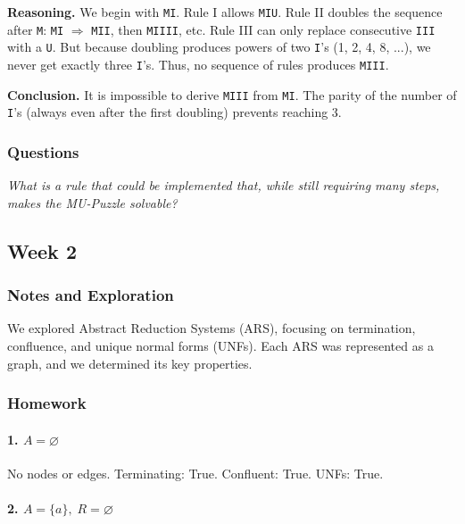 \documentclass[11pt]{article}
\newcommand{\ARSnode}[1]{%
  \node[circle,draw,minimum size=7mm,inner sep=0pt] (#1) {$#1$};%
}
\begin{document}
\textbf{Reasoning.}  
We begin with \texttt{MI}.  
Rule I allows \texttt{MIU}.  
Rule II doubles the sequence after \texttt{M}: \texttt{MI} $\Rightarrow$ \texttt{MII}, then \texttt{MIIII}, etc.  
Rule III can only replace consecutive \texttt{III} with a \texttt{U}.  
But because doubling produces powers of two \texttt{I}'s (1, 2, 4, 8, ...), 
we never get exactly three \texttt{I}'s.  
Thus, no sequence of rules produces \texttt{MIII}.  

\textbf{Conclusion.}  
It is impossible to derive \texttt{MIII} from \texttt{MI}.  
The parity of the number of \texttt{I}'s (always even after the first doubling) prevents reaching 3.

\subsubsection{Questions}
\emph{What is a rule that could be implemented that, while still requiring many steps, makes the MU-Puzzle solvable?}

\subsection{Week 2}

\subsubsection{Notes and Exploration}
We explored Abstract Reduction Systems (ARS), focusing on termination, confluence, and unique normal forms (UNFs). 
Each ARS was represented as a graph, and we determined its key properties.

\subsubsection{Homework}
\paragraph{1.\; $A=\varnothing$}
No nodes or edges.  
Terminating: True. Confluent: True. UNFs: True.

\paragraph{2.\; $A=\{a\},\; R=\varnothing$}
\end{document}
